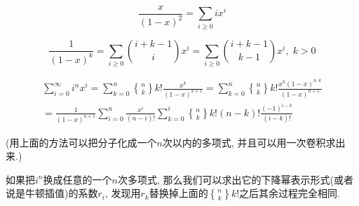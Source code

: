 $$\frac x {(1 - x) ^ 2} = \sum_{i \ge 0} i x ^ i$$

$$\frac 1 {(1 - x) ^ k} = \sum_{i \ge 0} {i + k - 1 \choose i} x ^ i = \sum_{i \ge 0} {i + k - 1 \choose k - 1}x^i, \; k > 0$$

$$
\begin{aligned}
	\sum_{i = 0} ^ \infty i^n x^i = \sum_{k = 0} ^ n {n \brace k} k! \frac {x^k} {(1-x) ^ {k + 1}} = \sum_{k = 0} ^ n {n \brace k} k! \frac {x^k (1-x) ^ {n – k}} {(1-x) ^ {n + 1}} \\
	= \frac 1 {(1-x) ^ {n + 1}} \sum_{i = 0} ^ n \frac {x^i} {(n-i)!} \sum_{k = 0} ^ i {n \brace k}k!(n-k)! \frac {(-1)^{i-k}} {(i-k)!}
\end{aligned}
$$

(用上面的方法可以把分子化成一个$n$次以内的多项式, 并且可以用一次卷积求出来.)

如果把$i^n$换成任意的一个$n$次多项式, 那么我们可以求出它的下降幂表示形式(或者说是牛顿插值)的系数$r_i$, 发现用$r_k$替换掉上面的${n \brace k}k!$之后其余过程完全相同.